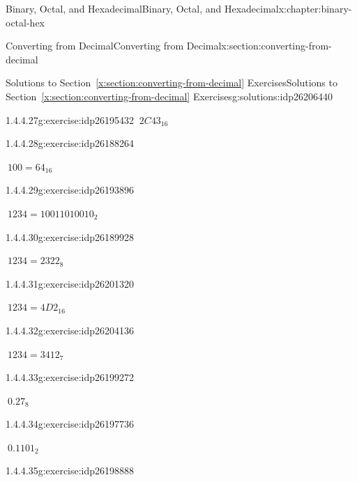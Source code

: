 \documentclass[twoside,10pt,]{book}
\newcommand{\xreffont}{\relax}
\numberwithin{equation}{section}
\begin{document}
\begin{chapterptx}{Binary, Octal, and Hexadecimal}{}{Binary, Octal, and Hexadecimal}{}{}{x:chapter:binary-octal-hex}
\begin{sectionptx}{Converting from Decimal}{}{Converting from Decimal}{}{}{x:section:converting-from-decimal}
\begin{solutions-subsection}{Solutions to Section~{\xreffont\ref*{x:section:converting-from-decimal}} Exercises}{}{Solutions to Section~{\xreffont\ref*{x:section:converting-from-decimal}} Exercises}{}{}{g:solutions:idp26206440}
\begin{exercisegroup}
\begin{divisionsolutioneg}{1.4.4.27}{}{g:exercise:idp26195432}
\noindent\hypertarget{g:solution:idp26191720-main}{}\(\ 2C43_{16}\)\end{divisionsolutioneg}%
\begin{divisionsolutioneg}{1.4.4.28}{}{g:exercise:idp26188264}%
\par\smallskip%
\noindent\hypertarget{g:solution:idp26193768-main}{}\(\ 100=64_{16}\)\end{divisionsolutioneg}%
\end{exercisegroup}
\par\medskip\noindent
\begin{exercisegroup}
\begin{divisionsolutioneg}{1.4.4.29}{}{g:exercise:idp26193896}%
\par\smallskip%
\noindent\hypertarget{g:solution:idp26189544-main}{}\(\ 1234=10011010010_2\)\end{divisionsolutioneg}%
\begin{divisionsolutioneg}{1.4.4.30}{}{g:exercise:idp26189928}%
\par\smallskip%
\noindent\hypertarget{g:solution:idp26200168-main}{}\(\ 1234=2322_8\)\end{divisionsolutioneg}%
\begin{divisionsolutioneg}{1.4.4.31}{}{g:exercise:idp26201320}%
\par\smallskip%
\noindent\hypertarget{g:solution:idp26201704-main}{}\(\ 1234=4D2_{16}\)\end{divisionsolutioneg}%
\begin{divisionsolutioneg}{1.4.4.32}{}{g:exercise:idp26204136}%
\par\smallskip%
\noindent\hypertarget{g:solution:idp26197096-main}{}\(\ 1234=3412_7\)\end{divisionsolutioneg}%
\end{exercisegroup}
\par\medskip\noindent
\begin{exercisegroup}
\begin{divisionsolutioneg}{1.4.4.33}{}{g:exercise:idp26199272}%
\par\smallskip%
\noindent\hypertarget{g:solution:idp26202984-main}{}\(\ 0.27_8\)\end{divisionsolutioneg}%
\begin{divisionsolutioneg}{1.4.4.34}{}{g:exercise:idp26197736}%
\par\smallskip%
\noindent\hypertarget{g:solution:idp26202472-main}{}\(\ 0.1101_2\)\end{divisionsolutioneg}%
\begin{divisionsolutioneg}{1.4.4.35}{}{g:exercise:idp26198888}%

\end{divisionsolutioneg}
\end{exercisegroup}
\end{solutions-subsection}
\end{sectionptx}
\end{chapterptx}
\end{document}

